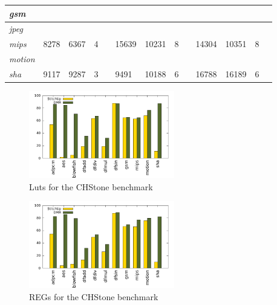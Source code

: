 \begin{table}[t]
\begin{tabular}{@{}|l|l|l|l|l|l|l|l|l|l|l|l|l|@{}}
\textit{gsm}        &              &              &              &                &              &              &              &                &              &              &              &                \\ \midrule
\textit{jpeg}       &              &              &              &                &              &              &              &                &              &              &              &                \\ \midrule
\textit{mips}       & 8278         & 6367         & 4            &                & 15639        & 10231        & 8            &                & 14304        & 10351        & 8            &                \\ \midrule
\textit{motion}     &              &              &              &                &              &              &              &                &              &              &              &                \\ \midrule
\textit{sha}        & 9117         & 9287         & 3            &                & 9491         & 10188        & 6            &                & 16788        & 16189        & 6            &                \\ \bottomrule
\end{tabular}
\end{table}


\begin{figure}[h]
\centering
\includegraphics[width=2.5in]{./graphs/chstone_luts_24_09_2015.pdf}
\caption{Luts for the CHStone benchmark}
\label{fig:luts_result}
\end{figure}

\begin{figure}[h]
\centering
\includegraphics[width=2.5in]{./graphs/chstone_reg_24_09_2015.pdf}
\caption{REGs for the CHStone benchmark}
\label{fig:regs_result}
\end{figure}

